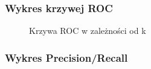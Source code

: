\documentclass[12pt, a4paper]{article}
\begin{document}
\subsubsection{Wykres krzywej ROC}

\begin{figure}[H]
  \begin{center}
  \end{center}
  \caption{Krzywa ROC w zależności od k}
  \label{fig:ibcf-k-roc}
\end{figure}

\subsubsection{Wykres Precision/Recall}
\end{document}
